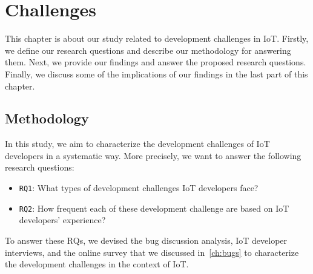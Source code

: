 
 
\chapter{Challenges}
\label{ch:Challenges}
This chapter is about our study related to development challenges in IoT. Firstly, we define our research questions and describe our methodology for answering them. Next, we provide our findings and answer the proposed research questions. Finally, we discuss some of the implications of our findings in the last part of this chapter.

\section{Methodology}
In this study, we aim to characterize the development challenges of IoT developers in a systematic way. More precisely, we want to answer the following research questions:
\begin{itemize}
\item {\verb|RQ1|}: What types of development challenges IoT developers face?
\item {\verb|RQ2|}: How frequent each of these development challenge are based on IoT developers' experience?
\end{itemize}

To answer these RQs, we devised the bug discussion analysis, IoT developer interviews, and the online survey that we discussed in~\autoref{ch:bugs} to characterize the development challenges in the context of IoT. 

